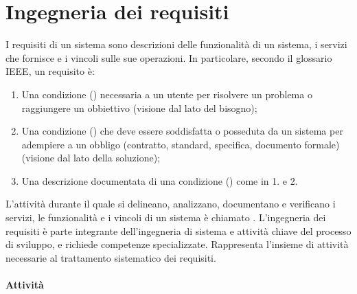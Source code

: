 \section{Ingegneria dei requisiti}

I requisiti di un sistema sono descrizioni delle funzionalità di un sistema, i
servizi che fornisce e i vincoli sulle sue operazioni. In particolare, secondo
il glossario IEEE, un requisito è:

\begin{enumerate}
  \item Una condizione () necessaria a un utente per
        risolvere un problema o raggiungere un obbiettivo (visione dal lato del
        bisogno);
  \item Una condizione () che deve essere soddisfatta o
        posseduta da un sistema per adempiere a un obbligo (contratto, standard,
        specifica, documento formale) (visione dal lato della soluzione);
  \item Una descrizione documentata di una condizione ()
        come in 1. e 2.
\end{enumerate}



L'attività durante il quale si delineano, analizzano, documentano e verificano i
servizi, le funzionalità e i vincoli di un sistema è chiamato . L'ingegneria dei requisiti è parte integrante dell'ingegneria di
sistema e attività chiave del processo di sviluppo, e richiede competenze
specializzate. Rappresenta l'insieme di attività necessarie al trattamento
sistematico dei requisiti.

\paragraph{Attività}

